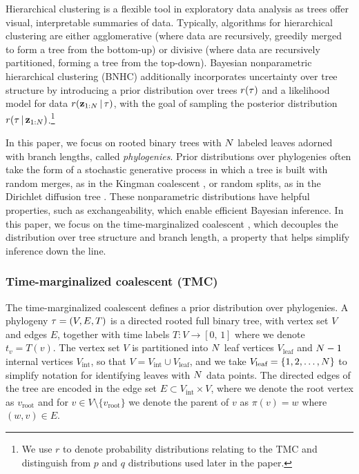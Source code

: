 Hierarchical clustering is a flexible
tool in exploratory data analysis
as trees offer visual, interpretable
summaries of data. Typically,
algorithms for hierarchical clustering are
either agglomerative
(where data are recursively, greedily merged to form
a tree from the bottom-up)
or divisive (where data
are recursively partitioned, forming a tree from the
top-down). Bayesian nonparametric hierarchical clustering (BNHC) 
additionally incorporates uncertainty over tree
structure by introducing
a prior distribution over trees $r(\tau)$ and
a likelihood model for data $r(\mathbf{z}_{1:N} \,|\, \tau)$,
with the goal of sampling
the posterior distribution $r(\tau \,|\, \mathbf{z}_{1:N})$.\footnote{We use $r$ to denote probability distributions
relating to the TMC and distinguish from $p$ and $q$
distributions used later in the paper.}

In this paper, we focus on
rooted binary trees with $N$ labeled leaves 
adorned with branch lengths,
called \emph{phylogenies}.
Prior distributions over phylogenies
often take the form of a stochastic generative
process in which a tree is built
with random merges, as in the Kingman coalescent \citep{Kingman1982},
or random splits, as in the Dirichlet diffusion tree \citep{Neal2003}.
These nonparametric distributions have
helpful properties, such as exchangeability,
which enable efficient Bayesian inference.
In this paper, we focus on the time-marginalized
coalescent \citep[TMC; ][]{Boyles2012}, which decouples the
distribution over tree structure and branch length,
a property that helps simplify inference down the line.

\subsubsection{Time-marginalized coalescent (TMC)}
The time-marginalized coalescent defines a prior distribution over phylogenies.
A phylogeny $\tau = (V, E, T)$ is a directed rooted full binary tree, with vertex set $V$ and edges $E$, together with time labels $T: V \to [0, \, 1]$ where we denote $t_v = T(v)$.
The vertex set $V$ is partitioned into $N$ leaf vertices $V_\text{leaf}$ and $N-1$ internal vertices $V_\text{int}$, so that $V = V_\text{int} \cup V_\text{leaf}$, and we take $V_\text{leaf} = \{1, 2, \ldots, N\}$ to simplify notation for identifying leaves with $N$ data points.
The directed edges of the tree are encoded in the edge set $E \subset V_\text{int} \times V$, where we denote the root vertex as $v_\text{root}$ and for $v \in V \setminus \{v_\text{root}\}$ we denote the parent of $v$ as $\pi(v) = w$ where $(w, v) \in E$.

